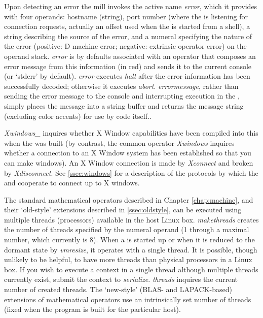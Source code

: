 Upon detecting an error the  mill invokes the active name
\emph{error}, which it provides with four operands: hostname (string),
port number (where the  is listening for connection
requests, actually an offset used when the  is started
from a shell), a string describing the source of the error, and a
numeral specifying the nature of the error (positive: D machine error;
negative: extrinsic operator error) on the operand stack. \emph{error}
is by defaults associated with an operator that composes an error
message from this information (in red) and sends it to the current
console (or `stderr' by default). \emph{error} executes \emph{halt}
after the error information has been successfully decoded; otherwise
it executes \emph{abort}. \emph{errormessage}, rather than sending the
error message to the console and interrupting execution in the
, simply places the message into a string buffer and
returns the message string (excluding color accents) for use by
 code itself..

\emph{Xwindows\_} inquires whether X Window capabilities have been
compiled into this  when the  was built (by
contrast, the common operator \emph{Xwindows} inquires whether a
connection to an X Window system has been established so that you can
make windows). An X Window connection is made by \emph{Xconnect} and
broken by \emph{Xdisconnect}. See \ref{ssec:windows} for a description
of the protocols by which the  and  cooperate
to connect up to X windows.

The standard mathematical operators described in Chapter
\ref{chap:machine}, and their `old-style' extensions described in
\ref{ssec:oldstyle}, can be executed using multiple threads
(processors) available in the host Linux box. \emph{makethreads}
creates the number of threads specified by the numeral operand (1
through a maximal number, which currently is 8). When a 
is started up or when it is reduced to the dormant state by
\emph{vmresize}, it operates with a single thread. It is possible,
though unlikely to be helpful, to have more threads than physical
processors in a Linux box. If you wish to execute a context in a
single thread although multiple threads currently exist, submit the
context to \emph{serialize}. \emph{threads} inquires the current
number of created threads. The `new-style' (BLAS- and LAPACK-based)
extensions of mathematical operators use an intrinsically set number
of threads (fixed when the  program is built for the
particular host).

